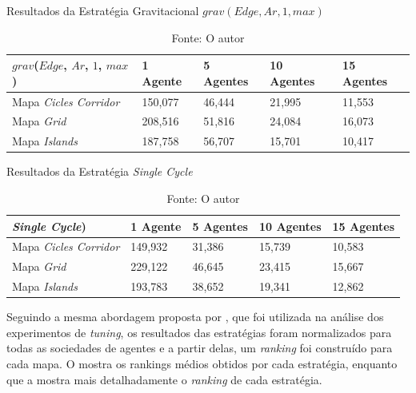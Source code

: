 \begin{table}
	\centering
	\caption{Resultados da Estratégia Gravitacional $grav(Edge,Ar,1,max)$}
	\label{result_grav3}
	\begin{tabularx}{\linewidth}{|X|X|X|X|X|}
		\hline
		\textbf{$grav$($Edge$, $Ar$, $1$, $max$)} & \textbf{1 Agente} & \textbf{5 Agentes} & \textbf{10 Agentes} & \textbf{15 Agentes} \\
		\hline
		Mapa \textit{Cicles Corridor} & 150,077 & 46,444 & 21,995 & 11,553 \\
		\hline
		Mapa \textit{Grid} & 208,516 & 51,816 & 24,084 & 16,073 \\
		\hline
		Mapa \textit{Islands} & 187,758 & 56,707 & 15,701 & 10,417 \\
		\hline
	\end{tabularx}
	\caption*{Fonte: O autor}
\end{table}

\begin{table}
	\centering
	\caption{Resultados da Estratégia \textit{Single Cycle}}
	\label{result_sc}
	\begin{tabularx}{\linewidth}{|X|X|X|X|X|}
		\hline
		\textbf{\textit{Single Cycle})} & \textbf{1 Agente} & \textbf{5 Agentes} & \textbf{10 Agentes} & \textbf{15 Agentes} \\
		\hline
		Mapa \textit{Cicles Corridor} & 149,932 & 31,386 & 15,739 & 10,583 \\
		\hline
		Mapa \textit{Grid} & 229,122 & 46,645 & 23,415 & 15,667 \\
		\hline
		Mapa \textit{Islands} & 193,783 & 38,652 & 19,341 & 12,862 \\
		\hline
	\end{tabularx}
	\caption*{Fonte: O autor}
\end{table}

Seguindo a mesma abordagem proposta por \citep{sampaiophd}, que foi utilizada na 
análise dos experimentos de \textit{tuning}, os resultados das estratégias foram 
normalizados para todas as sociedades de agentes e a partir delas, um 
\textit{ranking} foi construído para cada mapa. O  mostra 
os rankings médios obtidos por cada estratégia, enquanto que a 
 mostra mais detalhadamente o \textit{ranking} de cada estratégia.

